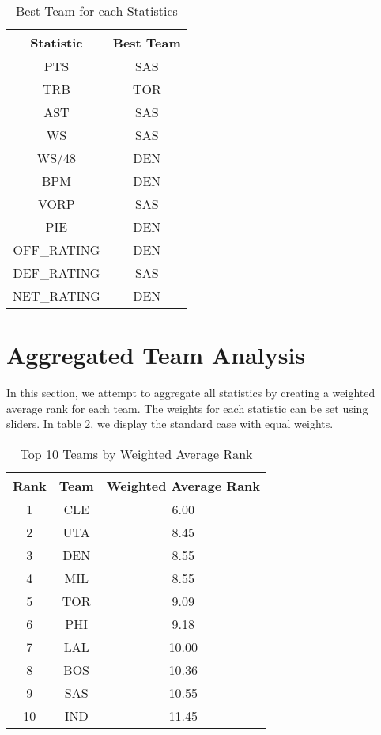 \documentclass[12pt]{article}
\begin{document}
\begin{table}[H]
\centering
\caption{Best Team for each Statistics}
\label{table:1}
\vspace{5mm} %
\begin{tabular}{|c|c|}
\hline
\rowcolor{gray!50} Statistic & Best Team \\ %
\hline
PTS & SAS \\
\hline
TRB & TOR \\
\hline
AST & SAS \\
\hline
WS & SAS \\
\hline
WS/48 & DEN \\
\hline
BPM & DEN \\
\hline
VORP & SAS \\
\hline
PIE & DEN \\
\hline
OFF\_RATING & DEN \\
\hline
DEF\_RATING & SAS \\
\hline
NET\_RATING & DEN \\
\hline
\end{tabular}
\end{table}


\section{Aggregated Team Analysis}
In this section, we attempt to aggregate all statistics by creating a weighted average rank for each team. The weights for each statistic can be set using sliders. In table 2, we display the standard case with equal weights.

\begin{table}[H]
    \centering
    \caption{Top 10 Teams by Weighted Average Rank}
    \vspace{5mm} %
    \label{table:2}
    \begin{tabular}{|c|c|c|}
    \hline
    \rowcolor{gray!50} Rank & Team & Weighted Average Rank \\ %
    \hline
    1 & CLE & 6.00 \\
    \hline
    2 & UTA & 8.45 \\
    \hline
    3 & DEN & 8.55 \\
    \hline
    4 & MIL & 8.55 \\
    \hline
    5 & TOR & 9.09 \\
    \hline
    6 & PHI & 9.18 \\
    \hline
    7 & LAL & 10.00 \\
    \hline
    8 & BOS & 10.36 \\
    \hline
    9 & SAS & 10.55 \\
    \hline
    10 & IND & 11.45 \\
    \hline
    \end{tabular}
    \end{table}
\end{document}
